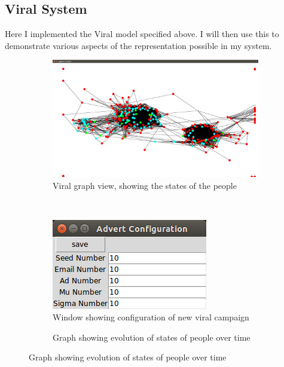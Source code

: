 \documentclass[12pt,a4paper]{article}
\begin{document}
\subsection{Viral System}

Here I implemented the Viral model specified above. I will then use this to demonstrate various aspects of the representation possible in my system.

\begin{figure}[htb]
\centering
\captionsetup[subfigure]{justification=centering}
	\begin{subfigure}[b]{0.3\linewidth}
	\caption{Viral graph view, showing the states of the people}
	\label{fig:viralStates}
	\includegraphics[scale=0.1]{Viral1.png}
	\end{subfigure}
\\
	\begin{subfigure}[b]{0.3\linewidth}
	\caption{Window showing configuration of new viral campaign}
	\label{fig:viralConfig}
	\includegraphics[scale=0.3]{Viral2.png}
	\end{subfigure}
\quad
	\begin{subfigure}[b]{0.3\linewidth}
	\caption{Graph showing evolution of states of people over time}
	\label{fig:viralGraph}

\end{subfigure}
\end{figure}
\end{document}
